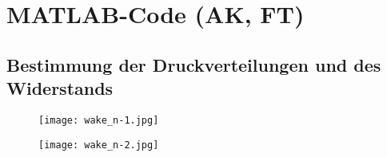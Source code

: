 \chapter{MATLAB-Code (AK, FT)}
\label{c:Anhang B}

\section{Bestimmung der Druckverteilungen und des Widerstands}
\label{C_w-Code}
\begin{figure}[h]
	\centering
	\texttt{[image: wake\_n-1.jpg]}
	\label{fig:C_w-Code}
\end{figure}
\begin{figure}
	\centering
	\texttt{[image: wake\_n-2.jpg]}
\end{figure}
	
	